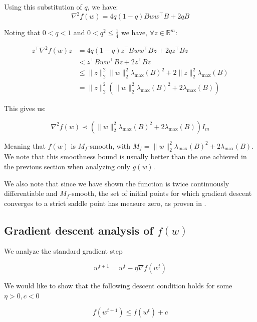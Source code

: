 \documentclass[11pt]{article}
\begin{document}
Using this substitution of $q$,  we have:
\begin{equation}
    \nabla^2 f(w) = 4q(1-q)Bww^{\top}B + 2qB
\end{equation}

Noting that $0 < q < 1$ and $0 < q^2 \leq \frac{1}{4}$ we have, $\forall z \in \mathbb{R}^m$:

\begin{align*}
z^{\top} \nabla^2 f(w) z 
&= 4q(1-q) z^{\top} Bww^{\top}B z + 2q z^{\top} B z \\
&< z^{\top} Bww^{\top}B z + 2 z^{\top} B z \\
&\leq \|z\|_2^2 \|w\|_2^2 \lambda_{\max} (B)^2 + 2 \|z\|_2^2 \lambda_{\max} (B) \\
&= \|z\|_2^2 ( \|w\|_2^2 \lambda_{\max} (B)^2 + 2 \lambda_{\max} (B) ) 
\end{align*}

This gives us:

\begin{equation}
    \nabla^2 f(w) \prec ( \|w\|_2^2 \lambda_{\max} (B)^2 + 2 \lambda_{\max} (B)) I_m
\end{equation}

Meaning that $f(w)$ is $M_f$-smooth, with $M_f = \|w\|_2^2 \lambda_{\max} (B)^2 + 2 \lambda_{\max} (B)$. We note that this smoothness bound is usually better than the one achieved in the previous section when analyzing only $g(w)$.

We also note that since we have shown the function is twice continuously differentiable and $M_f$-smooth, the set of initial points for which gradient descent converges to a strict saddle point has measure zero, as proven in \cite{lee_gradient_nodate}.

\subsection{Gradient descent analysis of $f(w)$}
\label{sec:grad_descent}

We analyze the standard gradient step

\begin{equation}
    w^{t+1} = w^t - \eta \nabla f(w^t)
\end{equation}

We would like to show that the following descent condition holds for some $\eta > 0, c < 0$

\begin{equation}
\label{eq:descent_condition}
    f(w^{t+1}) \leq f(w^t) + c
\end{equation}
\end{document}

